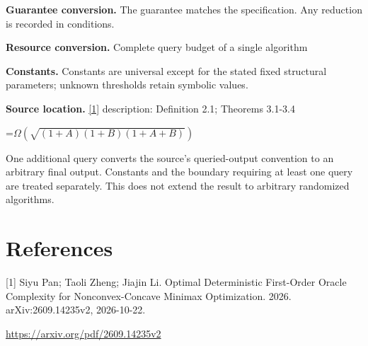 \documentclass[10pt,a4paper]{article}
\newcommand{\AtlasMath}[1]{\par\begingroup\centering\setbox0=\hbox{$\displaystyle #1$}\ifdim\wd0>1.4\linewidth\typeout{ATLAS WIDE FORMULA: \the\wd0}\fi\ifdim\wd0>\linewidth\resizebox{\linewidth}{!}{\box0}\else\box0\fi\par\endgroup}
\begin{document}
\textbf{Guarantee conversion.} The guarantee matches the specification. Any reduction is recorded in conditions.

\textbf{Resource conversion.} Complete query budget of a single algorithm

\textbf{Constants.} Constants are universal except for the stated fixed structural parameters; unknown thresholds retain symbolic values.

\textbf{Source location.} \href{https://arxiv.org/pdf/2609.14235v2}{[1]} description: Definition 2.1; Theorems 3.1-3.4

\AtlasMath{\Omega(\sqrt{(1+A)(1+B)(1+A+B)})}
One additional query converts the source’s queried-output convention to an arbitrary final output. Constants and the boundary requiring at least one query are treated separately. This does not extend the result to arbitrary randomized algorithms.

\section{References}
[1] Siyu Pan; Taoli Zheng; Jiajin Li. Optimal Deterministic First-Order Oracle Complexity for Nonconvex-Concave Minimax Optimization. 2026. arXiv:2609.14235v2, 2026-10-22.

\url{https://arxiv.org/pdf/2609.14235v2}
\end{document}
